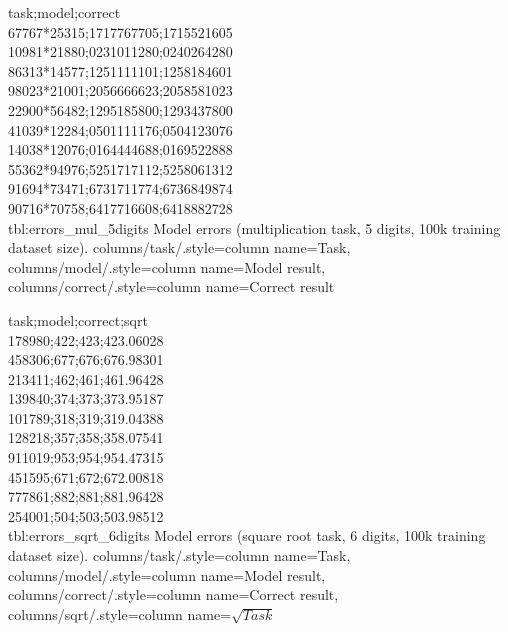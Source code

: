 {
	task;model;correct\\
	67767*25315;1717767705;1715521605\\
	10981*21880;0231011280;0240264280\\
	86313*14577;1251111101;1258184601\\
	98023*21001;2056666623;2058581023\\
	22900*56482;1295185800;1293437800\\
	41039*12284;0501111176;0504123076\\
	14038*12076;0164444688;0169522888\\
	55362*94976;5251717112;5258061312\\
	91694*73471;6731711774;6736849874\\
	90716*70758;6417716608;6418882728\\
}
{tbl:errors_mul_5digits}
{
	Model errors (multiplication task, 5 digits, 100k training dataset size).
}
{
	columns/task/.style={column name={Task}},
	columns/model/.style={column name={Model result}},
	columns/correct/.style={column name={Correct result}}
}


{
	task;model;correct;sqrt\\
	178980;422;423;423.06028\\
	458306;677;676;676.98301\\
	213411;462;461;461.96428\\
	139840;374;373;373.95187\\
	101789;318;319;319.04388\\
	128218;357;358;358.07541\\
	911019;953;954;954.47315\\
	451595;671;672;672.00818\\
	777861;882;881;881.96428\\
	254001;504;503;503.98512\\
}
{tbl:errors_sqrt_6digits}
{
	Model errors (square root task, 6 digits, 100k training dataset size).
}
{
	columns/task/.style={column name={Task}},
	columns/model/.style={column name={Model result}},
	columns/correct/.style={column name={Correct result}},
	columns/sqrt/.style={column name={$\sqrt{Task}$}}
}


